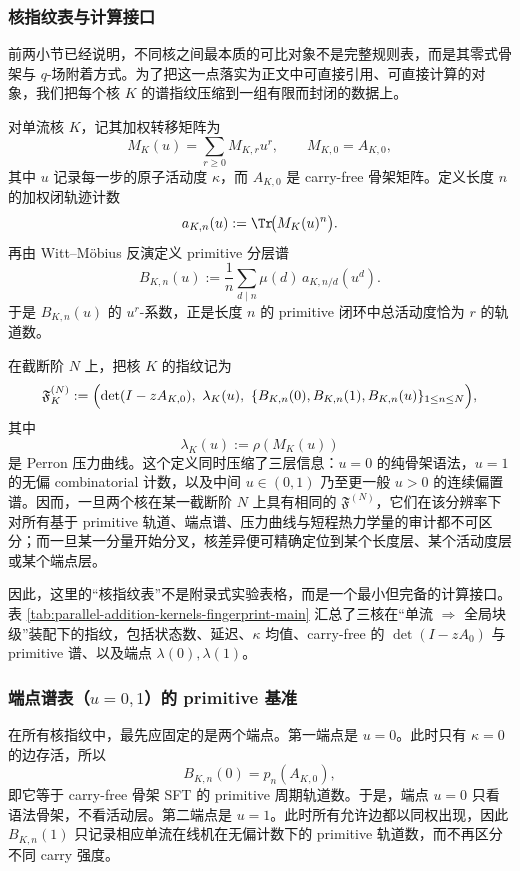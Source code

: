 \subsubsection{核指纹表与计算接口}
前两小节已经说明，不同核之间最本质的可比对象不是完整规则表，而是其零式骨架与 \(q\)-场附着方式。为了把这一点落实为正文中可直接引用、可直接计算的对象，我们把每个核 \(K\) 的谱指纹压缩到一组有限而封闭的数据上。

对单流核 \(K\)，记其加权转移矩阵为
\[
M_K(u)=\sum_{r\ge 0} M_{K,r}u^r,
\qquad
M_{K,0}=A_{K,0},
\]
其中 \(u\) 记录每一步的原子活动度 \(\kappa\)，而 \(A_{K,0}\) 是 carry-free 骨架矩阵。定义长度 \(n\) 的加权闭轨迹计数
\[
a_{K,n}(u):=\Tr\!\bigl(M_K(u)^n\bigr).
\]
再由 Witt--M\"obius 反演定义 primitive 分层谱
\[
B_{K,n}(u):=
\frac{1}{n}\sum_{d\mid n}\mu(d)\,a_{K,n/d}(u^d).
\]
于是 \(B_{K,n}(u)\) 的 \(u^r\)-系数，正是长度 \(n\) 的 primitive 闭环中总活动度恰为 \(r\) 的轨道数。

在截断阶 \(N\) 上，把核 \(K\) 的指纹记为
\[
\mathfrak F^{(N)}_K
:=
\Bigl(
\det(I-zA_{K,0}),
\ \lambda_K(u),
\ \{B_{K,n}(0),B_{K,n}(1),B_{K,n}(u)\}_{1\le n\le N}
\Bigr),
\]
其中
\[
\lambda_K(u):=\rho(M_K(u))
\]
是 Perron 压力曲线。这个定义同时压缩了三层信息：\(u=0\) 的纯骨架语法，\(u=1\) 的无偏 combinatorial 计数，以及中间 \(u\in(0,1)\) 乃至更一般 \(u>0\) 的连续偏置谱。因而，一旦两个核在某一截断阶 \(N\) 上具有相同的 \(\mathfrak F^{(N)}\)，它们在该分辨率下对所有基于 primitive 轨道、端点谱、压力曲线与短程热力学量的审计都不可区分；而一旦某一分量开始分叉，核差异便可精确定位到某个长度层、某个活动度层或某个端点层。

因此，这里的“核指纹表”不是附录式实验表格，而是一个最小但完备的计算接口。表 \ref{tab:parallel-addition-kernels-fingerprint-main} 汇总了三核在“单流 \(\Rightarrow\) 全局块级”装配下的指纹，包括状态数、延迟、\(\kappa\) 均值、carry-free 的 \(\det(I-zA_0)\) 与 primitive 谱、以及端点 \(\lambda(0),\lambda(1)\)。


\subsubsection{端点谱表（\texorpdfstring{$u=0,1$}{u=0,1}）的 primitive 基准}\label{subsec:kernel-endpoint-primitive}
在所有核指纹中，最先应固定的是两个端点。第一端点是 \(u=0\)。此时只有 \(\kappa=0\) 的边存活，所以
\[
B_{K,n}(0)=p_n(A_{K,0}),
\]
即它等于 carry-free 骨架 SFT 的 primitive 周期轨道数。于是，端点 \(u=0\) 只看语法骨架，不看活动层。第二端点是 \(u=1\)。此时所有允许边都以同权出现，因此 \(B_{K,n}(1)\) 只记录相应单流在线机在无偏计数下的 primitive 轨道数，而不再区分不同 carry 强度。

